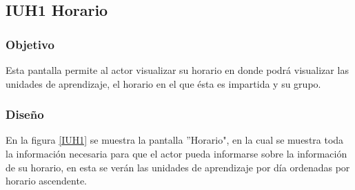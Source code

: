 \subsection{IUH1 Horario}

\subsubsection{Objetivo}

Esta pantalla permite al actor visualizar su horario en donde podrá visualizar las unidades de aprendizaje, el horario en el que ésta es impartida y su grupo.

\subsubsection{Diseño}

En la figura \ref{IUH1} se muestra la pantalla ''Horario", en la cual se muestra toda la información necesaria para que el actor pueda informarse sobre la información de su horario, en esta se verán las unidades de aprendizaje por día ordenadas por horario ascendente.

